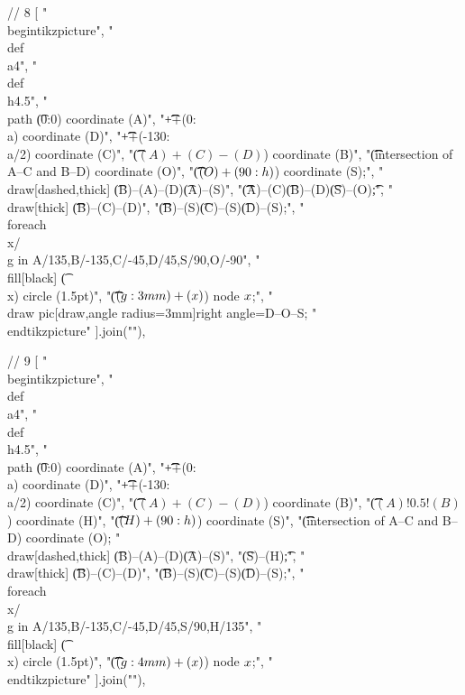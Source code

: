 // 8
[
"\\begin{tikzpicture}",
"\t\\def\\a{4}",
"\t\\def\\h{4.5}",
"\t\\path \t(0:0) coordinate (A)",
"\t\t\t++(0:\\a) coordinate (D)",
"\t\t\t++(-130:\\a/2) coordinate (C)",
"\t\t\t($(A)+(C)-(D)$) coordinate (B)",
"\t\t\t(intersection of A--C and B--D) coordinate (O)",
"\t\t\t($(O)+(90:\\h)$) coordinate (S);",
"\t\\draw[dashed,thick] \t(B)--(A)--(D)\t(A)--(S)",
"\t\t\t(A)--(C)\t(B)--(D)\t(S)--(O)\t;",
"\t\\draw[thick] \t\t\t(B)--(C)--(D)",
"\t\t\t(B)--(S)\t(C)--(S)\t(D)--(S);",
"\t\\foreach \\x/\\g in {A/135,B/-135,C/-45,D/45,S/90,O/-90}",
"\t\t\t\\fill[black] \t(\\x) circle (1.5pt)",
"\t\t\t($(\\g:3mm)+(\\x)$) node {$\\x$};",
"\t\\draw pic[draw,angle radius=3mm]{right angle=D--O--S};%
"\\end{tikzpicture}"
].join("\n"),

// 9
[
"\\begin{tikzpicture}",
"\t\\def\\a{4}",
"\t\\def\\h{4.5}",
"\t\\path \t(0:0) coordinate (A)",
"\t\t\t++(0:\\a) coordinate (D)",
"\t\t\t++(-130:\\a/2) coordinate (C)",
"\t\t\t($(A)+(C)-(D)$) coordinate (B)",
"\t\t\t($(A)!0.5!(B)$) coordinate (H)",
"\t\t\t($(H)+(90:\\h)$) coordinate (S)",
"\t\t\t(intersection of A--C and B--D) coordinate (O);%
"\t\\draw[dashed,thick] \t(B)--(A)--(D)\t(A)--(S)",
"\t(S)--(H)\t;",
"\t\\draw[thick] \t\t\t(B)--(C)--(D)",
"\t\t\t(B)--(S)\t(C)--(S)\t(D)--(S);",
"\t\\foreach \\x/\\g in {A/135,B/-135,C/-45,D/45,S/90,H/135}",
"\t\t\t\\fill[black] \t(\\x) circle (1.5pt)",
"\t\t\t($(\\g:4mm)+(\\x)$) node {$\\x$};",
"\\end{tikzpicture}"
].join("\n"),

